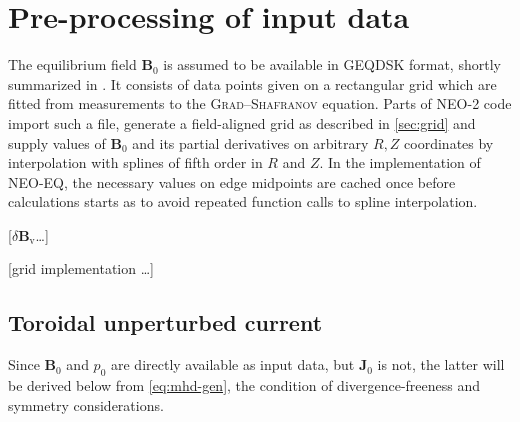 \documentclass[a4paper, twoside, 10pt, english]{article}
\numberwithin{equation}{section}
\let\vec\symbf
\newcommand*\Bvac{\ensuremath{\delta \vec{B}_{\text{v}}}}  %
\begin{document}
\section{Pre-processing of input data}
\label{sec:inputs}

The equilibrium field $\vec{B}_{0}$ is assumed to be available in GEQDSK format, shortly summarized in \cite{Lao97}. It consists of data points given on a rectangular grid which are fitted from measurements to the \textsc{Grad}--\textsc{Shafranov} equation. Parts of NEO-2 code import such a file, generate a field-aligned grid as described in \cref{sec:grid} and supply values of $\vec{B}_{0}$ and its partial derivatives on arbitrary $R, Z$ coordinates by interpolation with splines of fifth order in $R$ and $Z$. In the implementation of NEO-EQ, the necessary values on edge midpoints are cached once before calculations starts as to avoid repeated function calls to spline interpolation.

[\Bvac \ldots]

[grid implementation \ldots]

\subsection{Toroidal unperturbed current}

Since $\vec{B}_{0}$ and $p_{0}$ are directly available as input data, but $\vec{J}_{0}$ is not, the latter will be derived below from \cref{eq:mhd-gen}, the condition of divergence-freeness and symmetry considerations.
\end{document}
